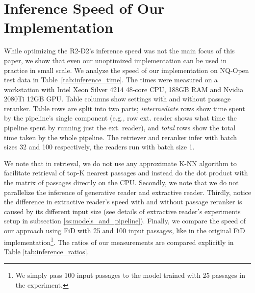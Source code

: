 \documentclass[11pt]{article}
\begin{document}
\section{Inference Speed of Our Implementation}
\label{app:inference time}
While optimizing the R2-D2’s inference speed was not the main focus of this paper, we show that even our unoptimized implementation can be used in practice in small scale. 
We analyze the speed of our implementation on NQ-Open test data in Table~\ref{tab:inference_time}. 
The times were measured on a workstation with Intel Xeon Silver 4214 48-core CPU, 188GB RAM and Nvidia 2080Ti 12GB GPU. 
Table columns  show settings with and without passage reranker. 
Table rows are split into two parts; \textit{intermediate} rows show time spent by the pipeline’s single component (e.g., row ext. reader shows what time the pipeline spent by running just the ext. reader), and \textit{total} rows show the total time taken by the whole pipeline. 
The retriever and reranker infer with batch sizes 32 and 100 respectively, the readers run with batch size 1.

We note that in retrieval, we do not use any approximate K-NN algorithm to facilitate retrieval of top-K nearest passages and instead do the dot product with the matrix of passages directly on the CPU.
Secondly, we note that we do not parallelize the inference of generative reader and extractive reader.
Thirdly, notice the difference in extractive reader’s speed with and without passage reranker is caused by its different input size (see details of extractive reader’s experiments setup in subsection \ref{ss:models_and_pipeline}). 
Finally, we compare the speed of our approach using FiD with 25 and 100 input passages, like in the original FiD implementation\footnote{We simply pass 100 input passages to the model trained with 25 passages in the experiment.}.
The ratios of our measurements are compared explicitly in Table \ref{tab:inference_ratios}. 
\end{document}
